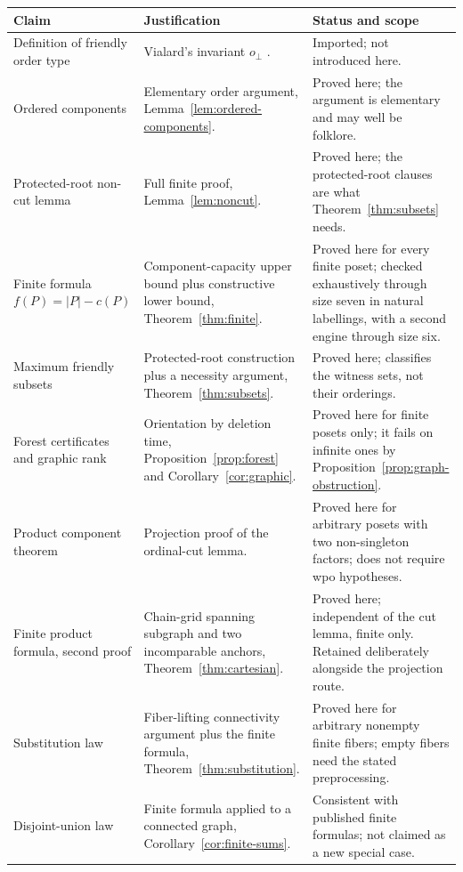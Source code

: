 \documentclass[11pt,letterpaper]{article}
\theoremstyle{definition}
\theoremstyle{remark}
\begin{document}
\small
\renewcommand{\arraystretch}{1.25}
\begin{longtable}{@{}p{}p{}p{}@{}}
\toprule
\textbf{Claim} & \textbf{Justification} & \textbf{Status and scope}\\
\midrule
\endhead
Definition of friendly order type & Vialard's invariant $o_\perp$
\cite[Definition~3.3]{Vialard2023}. & Imported; not introduced here.\\
Ordered components & Elementary order argument,
Lemma~\ref{lem:ordered-components}. & Proved here; the argument is
elementary and may well be folklore.\\
Protected-root non-cut lemma & Full finite proof,
Lemma~\ref{lem:noncut}. & Proved here; the protected-root clauses are what
Theorem~\ref{thm:subsets} needs.\\
Finite formula $f(P)=|P|-c(P)$ & Component-capacity upper bound plus
constructive lower bound, Theorem~\ref{thm:finite}. & Proved here for every
finite poset; checked exhaustively through size seven in natural labellings,
with a second engine through size six.\\
Maximum friendly subsets & Protected-root construction plus a necessity
argument, Theorem~\ref{thm:subsets}. & Proved here; classifies the witness
sets, not their orderings.\\
Forest certificates and graphic rank & Orientation by deletion time,
Proposition~\ref{prop:forest} and Corollary~\ref{cor:graphic}. & Proved
here for finite posets only; it fails on infinite ones by
Proposition~\ref{prop:graph-obstruction}.\\
Product component theorem & Projection proof of the ordinal-cut lemma. &
Proved here for arbitrary posets with two non-singleton factors; does not
require wpo hypotheses.\\
Finite product formula, second proof & Chain-grid spanning subgraph and two
incomparable anchors, Theorem~\ref{thm:cartesian}. & Proved here;
independent of the cut lemma, finite only. Retained deliberately alongside
the projection route.\\
Substitution law & Fiber-lifting connectivity argument plus the finite
formula, Theorem~\ref{thm:substitution}. & Proved here for arbitrary
nonempty finite fibers; empty fibers need the stated preprocessing.\\
Disjoint-union law & Finite formula applied to a connected graph,
Corollary~\ref{cor:finite-sums}. & Consistent with published finite
formulas; not claimed as a new special case.\\

\end{longtable}
\end{document}
